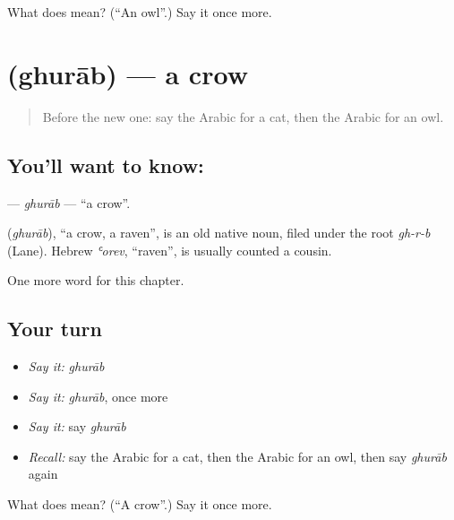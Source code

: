\begin{tcolorbox}[breakable,colback=teal!4,colframe=teal!35!black,title={Before you move on}]
What does  mean? (\textquotedblleft{}An owl\textquotedblright{}.) Say it once more.
\end{tcolorbox}
\section[\texorpdfstring{\ar{غراب} (ghurāb)}{غراب (ghurāb)}]{ (ghurāb) — a crow}

\label{lesson:AR-C137-ghurab}



\begin{quote}
Before the new one: say the Arabic for a cat, then the Arabic for an owl.
\end{quote}

\subsection*{You'll want to know: }
\textbf{} — \emph{ghurāb} — \textquotedblleft{}a crow\textquotedblright{}.

\begin{cousinweb}
\textbf{} (\emph{ghurāb}), \textquotedblleft{}a crow, a raven\textquotedblright{}, is an old native noun, filed under the root \emph{gh-r-b} (Lane). Hebrew \emph{ʿorev}, \textquotedblleft{}raven\textquotedblright{}, is usually counted a cousin.
\end{cousinweb}

\begin{grammarlens}[title={What you've built}]
One more word for this chapter.
\end{grammarlens}

\subsection*{Your turn}
\begin{itemize}
\raggedright
  \item \emph{Say it:} \emph{ghurāb}
  \item \emph{Say it:} \emph{ghurāb}, once more
  \item \emph{Say it:} say \emph{ghurāb}
  \item \emph{Recall:} say the Arabic for a cat, then the Arabic for an owl, then say \emph{ghurāb} again
\end{itemize}

\begin{tcolorbox}[breakable,colback=teal!4,colframe=teal!35!black,title={Before you move on}]
What does  mean? (\textquotedblleft{}A crow\textquotedblright{}.) Say it once more.
\end{tcolorbox}
